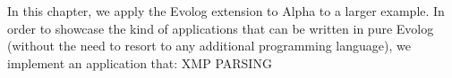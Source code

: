 In this chapter, we apply the Evolog extension to Alpha to a larger example. In order to showcase the kind of applications that can be written in pure Evolog (without the need to resort to any additional programming language), we implement an application that:
XMP PARSING